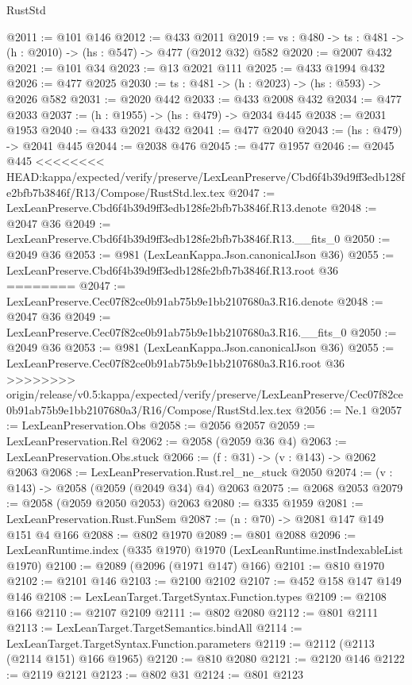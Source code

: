 \begin{lexlean}{RustStd}
\begin{coremodule}
{\begin{coremodule}
{{{{@2011 := @101 @146
@2012 := @433 @2011
@2019 := {vs : @480} -> {ts : @481} -> (h : @2010) -> (hs : @547) -> @477 (@2012 @32) @582
@2020 := @2007 @432
@2021 := @101 @34
@2023 := @13 @2021 @111
@2025 := @433 @1994 @432
@2026 := @477 @2025
@2030 := {ts : @481} -> (h : @2023) -> (hs : @593) -> @2026 @582
@2031 := @2020 @442
@2033 := @433 @2008 @432
@2034 := @477 @2033
@2037 := (h : @1955) -> (hs : @479) -> @2034 @445
@2038 := @2031 @1953
@2040 := @433 @2021 @432
@2041 := @477 @2040
@2043 := (hs : @479) -> @2041 @445
@2044 := @2038 @476
@2045 := @477 @1957
@2046 := @2045 @445
<<<<<<<< HEAD:kappa/expected/verify/preserve/LexLeanPreserve/Cbd6f4b39d9ff3edb128fe2bfb7b3846f/R13/Compose/RustStd.lex.tex
@2047 := LexLeanPreserve.Cbd6f4b39d9ff3edb128fe2bfb7b3846f.R13.denote
@2048 := @2047 @36
@2049 := LexLeanPreserve.Cbd6f4b39d9ff3edb128fe2bfb7b3846f.R13.__fits_0
@2050 := @2049 @36
@2053 := @981 (LexLeanKappa.Json.canonicalJson @36)
@2055 := LexLeanPreserve.Cbd6f4b39d9ff3edb128fe2bfb7b3846f.R13.root @36
========
@2047 := LexLeanPreserve.Cec07f82ce0b91ab75b9e1bb2107680a3.R16.denote
@2048 := @2047 @36
@2049 := LexLeanPreserve.Cec07f82ce0b91ab75b9e1bb2107680a3.R16.__fits_0
@2050 := @2049 @36
@2053 := @981 (LexLeanKappa.Json.canonicalJson @36)
@2055 := LexLeanPreserve.Cec07f82ce0b91ab75b9e1bb2107680a3.R16.root @36
>>>>>>>> origin/release/v0.5:kappa/expected/verify/preserve/LexLeanPreserve/Cec07f82ce0b91ab75b9e1bb2107680a3/R16/Compose/RustStd.lex.tex
@2056 := Ne.{1}
@2057 := LexLeanPreservation.Obs
@2058 := @2056 @2057
@2059 := LexLeanPreservation.Rel
@2062 := @2058 (@2059 @36 @4)
@2063 := LexLeanPreservation.Obs.stuck
@2066 := (f : @31) -> (v : @143) -> @2062 @2063
@2068 := LexLeanPreservation.Rust.rel_ne_stuck @2050
@2074 := (v : @143) -> @2058 (@2059 (@2049 @34) @4) @2063
@2075 := @2068 @2053
@2079 := @2058 (@2059 @2050 @2053) @2063
@2080 := @335 @1959
@2081 := LexLeanPreservation.Rust.FunSem
@2087 := (n : @70) -> @2081 @147 @149 @151 @4 @166
@2088 := @802 @1970
@2089 := @801 @2088
@2096 := LexLeanRuntime.index (@335 @1970) @1970 (LexLeanRuntime.instIndexableList @1970)
@2100 := @2089 (@2096 (@1971 @147) @166)
@2101 := @810 @1970
@2102 := @2101 @146
@2103 := @2100 @2102
@2107 := @452 @158 @147 @149 @146
@2108 := LexLeanTarget.TargetSyntax.Function.types
@2109 := @2108 @166
@2110 := @2107 @2109
@2111 := @802 @2080
@2112 := @801 @2111
@2113 := LexLeanTarget.TargetSemantics.bindAll
@2114 := LexLeanTarget.TargetSyntax.Function.parameters
@2119 := @2112 (@2113 (@2114 @151) @166 @1965)
@2120 := @810 @2080
@2121 := @2120 @146
@2122 := @2119 @2121
@2123 := @802 @31
@2124 := @801 @2123
}}}}
\end{coremodule}}
\end{coremodule}
\end{lexlean}
